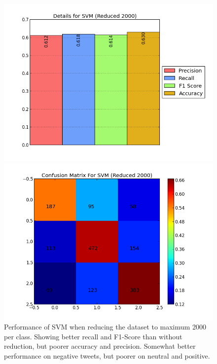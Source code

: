 \begin{figure}[t!]
	\centering
	\begin{minipage}{.45\linewidth}
		\includegraphics[width=\linewidth]{../img/plots/analysis/svm_stats_best_reduced_2000.png}
	\end{minipage}
	\hspace{0.05\linewidth}
	\begin{minipage}{.45\linewidth}
		\includegraphics[width=\linewidth]{../img/plots/analysis/svm_confusion_matrix_best_reduced_2000.png}
	\end{minipage}
	\caption[Performance of SVM when reducing the dataset to max 2000 per class]{Performance of SVM when reducing the dataset to maximum 2000 per class. Showing better recall and F1-Score than without reduction, but poorer accuracy and precision. Somewhat better performance on negative tweets, but poorer on neutral and positive.}
	\label{fig:svm_reduced_2000}
\end{figure}

